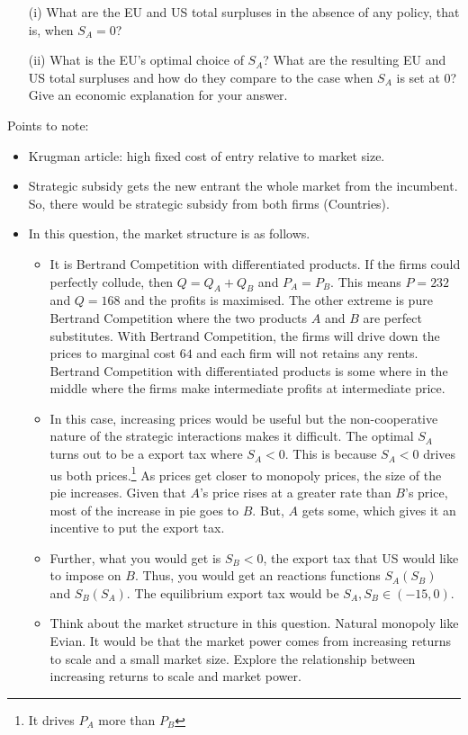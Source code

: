 \begin{enumerate}
\begin{enumerate}
	\begin{enumerate}
		\item [(i)] What are the EU and US total surpluses in the absence of any policy, that is, when $S_{A}=0$? 
		\item [(ii)] What is the EU's optimal choice of $S_{A}$? What are the resulting EU and US total surpluses and how do they compare to the case when $S_{A}$ is set at 0? Give an economic explanation for your answer.
		\end{enumerate}
		\end{enumerate}
	
	\newpage


	
	Points to note: 
	\begin{itemize}
		\item Krugman article: high fixed cost of entry relative to market size.
		\item Strategic subsidy gets the new entrant the whole market from the incumbent. So, there would be strategic subsidy from both firms (Countries).
		\item In this question, the market structure is as follows.
		\begin{itemize}
			\item It is Bertrand Competition with differentiated products. If the firms could perfectly collude, then $Q=Q_{A}+Q_{B}$ and $P_{A}=P_{B}$. This means $P=232$ and $Q=168$ and the profits is maximised. The other extreme is pure Bertrand Competition where the two products $A$ and $B$ are perfect substitutes. With Bertrand Competition, the firms will drive down the prices to marginal cost $64$ and each  firm will not retains any rents. Bertrand Competition with differentiated products is some where in the middle where the firms make intermediate profits at intermediate price. 
			\item In this case, increasing prices would be useful but the non-cooperative nature of the strategic interactions makes it difficult. The optimal $S_{A}$ turns out to be a export tax where $S_{A}<0$. This is because $S_{A}<0$ drives us both prices.\footnote{It drives $P_{A}$ more than $P_{B}$} As prices get closer to monopoly prices, the size of the pie increases. Given that $A$'s price rises at a greater rate than $B$'s price, most of the increase in pie goes to $B$. But, $A$ gets some, which gives it an incentive to put the export tax.
			\item Further, what you would get is $S_{B}<0$, the export tax that US would like to impose on $B$. Thus, you would get an reactions functions $S_{A}(S_{B})$ and $S_{B}(S_{A})$. The equilibrium export tax would be $S_{A}, S_{B} \in (-15, 0)$.
			\item Think about the market structure in this question. Natural monopoly like Evian. It would be that the market power comes from increasing returns to scale and a small market size. Explore the relationship between increasing returns to scale and market power. 
		\end{itemize}
	\end{itemize}


\end{enumerate}
